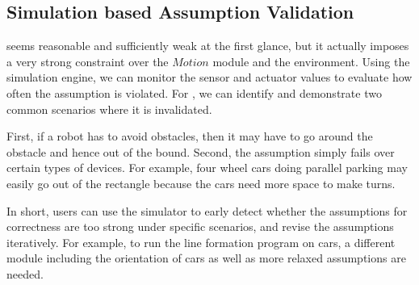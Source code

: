 \begin{figure}
\end{figure}


\subsection{Simulation based Assumption Validation}

 seems reasonable and sufficiently weak at the first glance,
but it actually imposes a very strong constraint over the $Motion$ module and the environment.
Using the simulation engine, we can monitor the sensor and actuator values to evaluate how often the assumption is violated.
For , we can identify and demonstrate two common scenarios
where it is invalidated.


First, if a robot has to avoid obstacles,
then it may have to go around the obstacle and hence out of the bound.
Second, the assumption simply fails over certain types of devices.
For example, four wheel cars doing parallel parking may easily go out of the rectangle
because the cars need more space to make turns.

In short, users can use the simulator to early detect whether
the assumptions for correctness are too strong under specific scenarios,
and revise the assumptions iteratively.
For example, to run the line formation program on cars,
a different module including the orientation of cars as well as more relaxed assumptions are needed.
